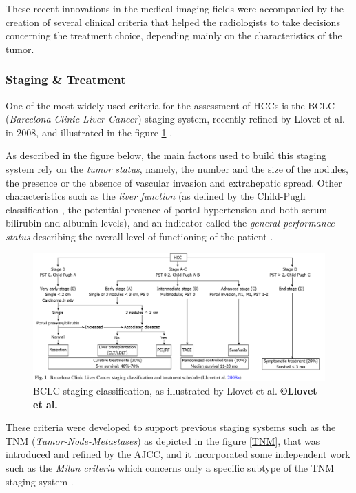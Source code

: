 \documentclass[]{article}
\begin{document}
These recent innovations in the medical imaging fields were accompanied
by the creation of several clinical criteria that helped the
radiologists to take decisions concerning the treatment choice,
depending mainly on the characteristics of the tumor.

\subsubsection*{Staging \& Treatment}\label{staging-treatment}

One of the most widely used criteria for the assessment of HCCs
is the BCLC (\emph{Barcelona Clinic Liver Cancer}) staging system, recently refined by Llovet et al. in
2008, and illustrated in the figure \ref{BCLC_llovet} \cite{Llovet2008}.

As described in the figure below, the main factors used to build this
staging system rely on the \emph{tumor status}, namely, the number and
the size of the nodules, the presence or the absence of vascular
invasion and extrahepatic spread. Other characteristics such as the
\emph{liver function} (as defined by the Child-Pugh classification
\cite{Pugh1973} , the potential presence of portal
hypertension and both serum bilirubin and albumin levels), and an
indicator called the \emph{general performance status} describing the
overall level of functioning of the patient \cite{Oken1982}.

\begin{figure}[th!]
\centering
\includegraphics[width=0.7\linewidth]{images/image9}
\caption{BCLC staging classification, as illustrated by Llovet et al. \textbf{©Llovet et al.} \cite{Llovet2008}}
\label{BCLC_llovet}
\end{figure}



These criteria were developed to support previous staging systems such
as the TNM (\emph{Tumor-Node-Metastases}) as depicted in the figure \ref{TNM}, that was introduced and refined by
the AJCC, and it incorporated some independent work such as the
\emph{Milan criteria} which concerns only a specific subtype of the
TNM staging system \cite{Mazzaferro1996}.
\end{document}
